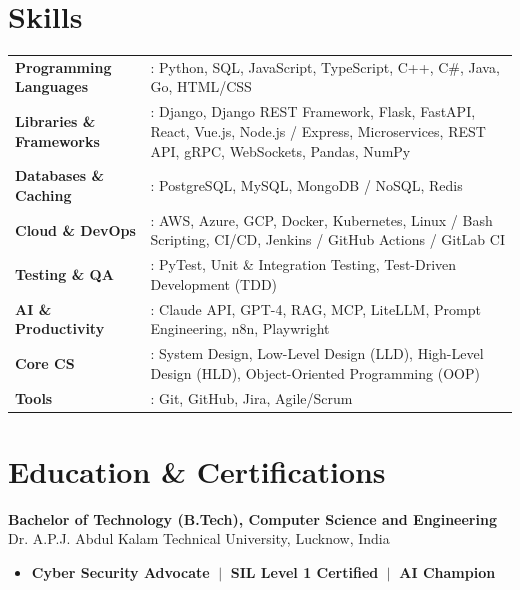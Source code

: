 \documentclass[a4paper,9pt]{extarticle}
\newcommand{\resumeItem}[1]{\item\small{#1}}
\newenvironment{resumeItemList}
  {\begin{itemize}[leftmargin=1.1em,labelsep=0.45em,topsep=1pt,parsep=0pt,itemsep=2pt,label=$\circ$]}
  {\end{itemize}\vspace{-1pt}}
\begin{document}
\section{Skills}
\small
\begin{tabular}{@{}p{1.75in}@{}p{5.45in}@{}}
\textbf{Programming Languages} & : Python, SQL, JavaScript, TypeScript, C++, C\#, Java, Go, HTML/CSS \\[1.5pt]
\textbf{Libraries \& Frameworks} & : Django, Django REST Framework, Flask, FastAPI, React, Vue.js, Node.js / Express, Microservices, REST API, gRPC, WebSockets, Pandas, NumPy \\[1.5pt]
\textbf{Databases \& Caching} & : PostgreSQL, MySQL, MongoDB / NoSQL, Redis \\[1.5pt]
\textbf{Cloud \& DevOps} & : AWS, Azure, GCP, Docker, Kubernetes, Linux / Bash Scripting, CI/CD, Jenkins / GitHub Actions / GitLab CI \\[1.5pt]
\textbf{Testing \& QA} & : PyTest, Unit \& Integration Testing, Test-Driven Development (TDD) \\[1.5pt]
\textbf{AI \& Productivity} & : Claude API, GPT-4, RAG, MCP, LiteLLM, Prompt Engineering, n8n, Playwright \\[1.5pt]
\textbf{Core CS} & : System Design, Low-Level Design (LLD), High-Level Design (HLD), Object-Oriented Programming (OOP) \\[1.5pt]
\textbf{Tools} & : Git, GitHub, Jira, Agile/Scrum \\
\end{tabular}

\section{Education \& Certifications}
\small
\textbf{Bachelor of Technology (B.Tech), Computer Science and Engineering}\\
Dr. A.P.J. Abdul Kalam Technical University, Lucknow, India

\vspace{3pt}
\begin{resumeItemList}
  \resumeItem{\textbf{Cyber Security Advocate} $\;\vert\;$ \textbf{SIL Level 1 Certified} $\;\vert\;$ \textbf{AI Champion}}
\end{resumeItemList}
\end{document}
